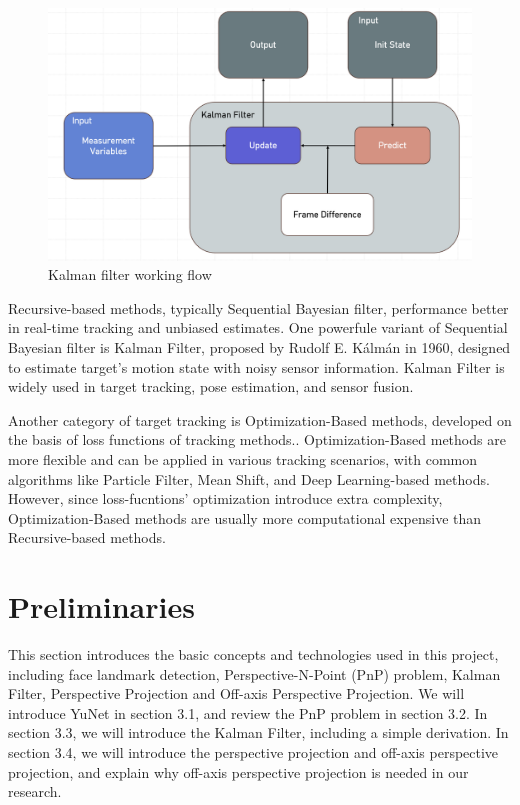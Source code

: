 \begin{figure}[htb]
    \centering
    \includegraphics[width=1\textwidth]{figures/Introduction/KalmanFilter.png}
    \caption{Kalman filter working flow}\label{F:test-a}
\end{figure}

Recursive-based methods, typically Sequential Bayesian filter, performance better in real-time tracking and unbiased estimates\cite{KumarMondal2021}. One powerfule variant of Sequential Bayesian filter is Kalman Filter, proposed by Rudolf E. Kálmán in 1960\cite{Kalman1960}, designed to estimate target's motion state with noisy sensor information. Kalman Filter is widely used in target tracking, pose estimation, and sensor fusion.


Another category of target tracking is Optimization-Based methods, developed on the basis of loss functions of tracking methods.\cite{KumarMondal2021}. Optimization-Based methods are more flexible and can be applied in various tracking scenarios, with common algorithms like Particle Filter, Mean Shift, and Deep Learning-based methods. However, since loss-fucntions' optimization introduce extra complexity, Optimization-Based methods are usually more computational expensive than Recursive-based methods.

\nocite{Khabarlak_2022}

\section {Preliminaries}
This section introduces the basic concepts and technologies used in this project, including face landmark detection, Perspective-N-Point (PnP) problem, Kalman Filter, Perspective Projection and Off-axis Perspective Projection. We will introduce YuNet in section 3.1, and review the PnP problem in section 3.2. In section 3.3, we will introduce the Kalman Filter, including a simple derivation. In section 3.4, we will introduce the perspective projection and off-axis perspective projection, and explain why off-axis perspective projection is needed in our research.
